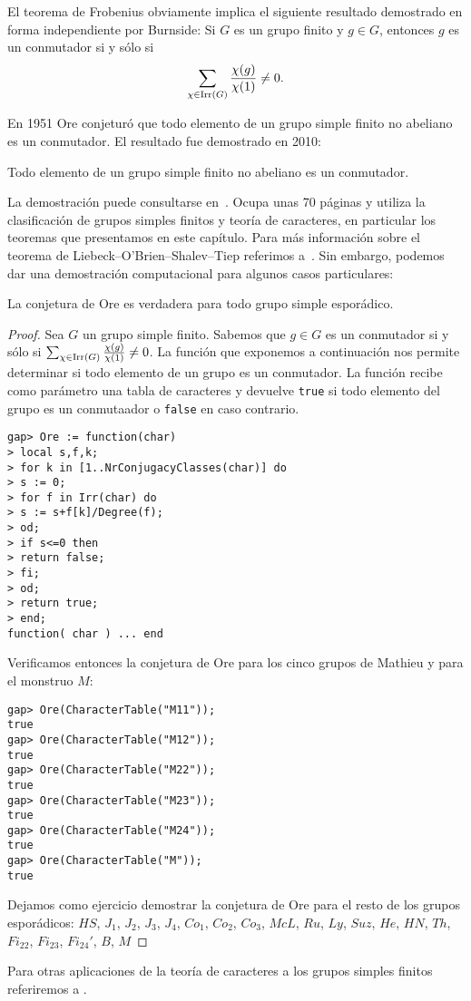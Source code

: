 El teorema de Frobenius obviamente implica 
el siguiente resultado demostrado en forma independiente 
por Burnside: Si $G$ es un 
grupo finito y $g\in G$, entonces $g$ 
es un conmutador si y sólo si 
\[
\sum_{\chi\in\operatorname{Irr}(G)}\frac{\chi(g)}{\chi(1)}\ne 0.
\]

En 1951 Ore conjeturó que todo elemento de un grupo simple finito no abeliano es un conmutador. 
El resultado fue demostrado en 2010:

\begin{theorem}
Todo elemento de un grupo simple finito no abeliano es un conmutador. 
\end{theorem}

La demostración puede consultarse en~\cite{MR2654085}. Ocupa unas 70 páginas y 
utiliza la clasificación de grupos simples finitos y teoría de caracteres, 
en particular los teoremas que presentamos en este capítulo. Para más información sobre 
el teorema de Liebeck--O'Brien--Shalev--Tiep
referimos a~\cite{MR3289286}. Sin embargo, podemos dar una demostración computacional
para algunos casos particulares:

\begin{proposition}
La conjetura de Ore es verdadera para todo grupo simple esporádico. 
\end{proposition}

\begin{proof}
Sea $G$ un grupo simple finito. 
Sabemos que $g\in G$ es un conmutador si y sólo si 
$\sum_{\chi\in\operatorname{Irr}(G)}\frac{\chi(g)}{\chi(1)}\ne 0$. 
La función que exponemos a continuación nos permite determinar 
si todo elemento de un grupo es un conmutador. La función recibe como parámetro una tabla de caracteres y 
devuelve \lstinline{true} si todo elemento del grupo es un conmutaador o \lstinline{false} en caso contrario. 
\begin{lstlisting}
gap> Ore := function(char) 
> local s,f,k;
> for k in [1..NrConjugacyClasses(char)] do
> s := 0;
> for f in Irr(char) do
> s := s+f[k]/Degree(f);  
> od;
> if s<=0 then
> return false;
> fi;
> od;
> return true;
> end;
function( char ) ... end
\end{lstlisting}
Verificamos entonces la conjetura de Ore para los cinco grupos de Mathieu y para el monstruo $M$:
\begin{lstlisting}
gap> Ore(CharacterTable("M11"));
true
gap> Ore(CharacterTable("M12"));
true
gap> Ore(CharacterTable("M22"));
true
gap> Ore(CharacterTable("M23"));
true
gap> Ore(CharacterTable("M24"));
true
gap> Ore(CharacterTable("M"));
true
\end{lstlisting}
Dejamos como ejercicio demostrar la conjetura de Ore para el resto de los grupos esporádicos: $HS$, $J_1$, $J_2$, $J_3$, $J_4$, $Co_1$, $Co_2$, $Co_3$, 
$McL$, $Ru$, $Ly$, $Suz$, $He$, $HN$, $Th$, $Fi_{22}$, $Fi_{23}$, $Fi_{24}'$, $B$, $M$ 
\end{proof}

Para otras aplicaciones de la teoría de caracteres a los grupos simples finitos referiremos a 
\cite{MR3821142}. 

